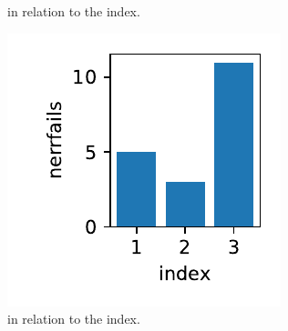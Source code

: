 \documentclass{report}
\begin{document}
\begin{figure}[h]
\begin{minipage}[t]{0.3\textwidth}
\caption{ in relation to the index.}
\label{pl:nfcns_nsteps_indx123}
\end{minipage}
\hfill
\begin{minipage}[t]{0.3\textwidth}
\centering
\includegraphics[width=\textwidth]{../Plots/Project2_main/Figure_603}
\caption{ in relation to the index.}
\label{pl:nerrfails_indx123}
\end{minipage}
\end{figure}
\end{document}
